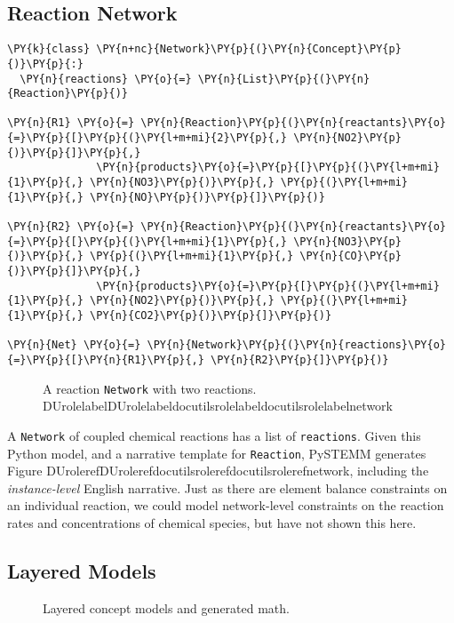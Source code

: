 \documentclass[letterpaper,compsoc,twoside]{IEEEtran}
\makeatletter
\def\PY@reset{\let\PY@it=\relax \let\PY@bf=\relax \let\PY@ul=\relax \let\PY@tc=\relax \let\PY@bc=\relax \let\PY@ff=\relax}
\def\PY@tok#1{\csname PY@tok@#1\endcsname}
\def\PY@toks#1+{\ifx\relax#1\empty\else \PY@tok{#1}\expandafter\PY@toks\fi}
\def\PY@do#1{\PY@bc{\PY@tc{\PY@ul{\PY@it{\PY@bf{\PY@ff{#1}}}}}}}
\def\PY#1#2{\PY@reset\PY@toks#1+\relax+\PY@do{#2}}
\providecommand*{\DUrole}[2]{\ifcsname DUrole#1\endcsname \csname DUrole#1\endcsname{#2}\else \ifcsname docutilsrole#1\endcsname \csname docutilsrole#1\endcsname{#2}\else #2\fi \fi }
\makeatother
\begin{document}
\subsection{Reaction Network\label{reaction-network}}
\begin{Verbatim}[commandchars=\\\{\},fontsize=\footnotesize]
\PY{k}{class} \PY{n+nc}{Network}\PY{p}{(}\PY{n}{Concept}\PY{p}{)}\PY{p}{:}
  \PY{n}{reactions} \PY{o}{=} \PY{n}{List}\PY{p}{(}\PY{n}{Reaction}\PY{p}{)}

\PY{n}{R1} \PY{o}{=} \PY{n}{Reaction}\PY{p}{(}\PY{n}{reactants}\PY{o}{=}\PY{p}{[}\PY{p}{(}\PY{l+m+mi}{2}\PY{p}{,} \PY{n}{NO2}\PY{p}{)}\PY{p}{]}\PY{p}{,}
              \PY{n}{products}\PY{o}{=}\PY{p}{[}\PY{p}{(}\PY{l+m+mi}{1}\PY{p}{,} \PY{n}{NO3}\PY{p}{)}\PY{p}{,} \PY{p}{(}\PY{l+m+mi}{1}\PY{p}{,} \PY{n}{NO}\PY{p}{)}\PY{p}{]}\PY{p}{)}

\PY{n}{R2} \PY{o}{=} \PY{n}{Reaction}\PY{p}{(}\PY{n}{reactants}\PY{o}{=}\PY{p}{[}\PY{p}{(}\PY{l+m+mi}{1}\PY{p}{,} \PY{n}{NO3}\PY{p}{)}\PY{p}{,} \PY{p}{(}\PY{l+m+mi}{1}\PY{p}{,} \PY{n}{CO}\PY{p}{)}\PY{p}{]}\PY{p}{,}
              \PY{n}{products}\PY{o}{=}\PY{p}{[}\PY{p}{(}\PY{l+m+mi}{1}\PY{p}{,} \PY{n}{NO2}\PY{p}{)}\PY{p}{,} \PY{p}{(}\PY{l+m+mi}{1}\PY{p}{,} \PY{n}{CO2}\PY{p}{)}\PY{p}{]}\PY{p}{)}

\PY{n}{Net} \PY{o}{=} \PY{n}{Network}\PY{p}{(}\PY{n}{reactions}\PY{o}{=}\PY{p}{[}\PY{n}{R1}\PY{p}{,} \PY{n}{R2}\PY{p}{]}\PY{p}{)}
\end{Verbatim}
\begin{figure}[]\noindent{}
\caption{A reaction \texttt{Network} with two reactions. \DUrole{label}{network}}
\end{figure}A \texttt{Network} of coupled chemical reactions has a list of \texttt{reactions}. Given this Python model, and a narrative template for \texttt{Reaction}, PySTEMM generates Figure \DUrole{ref}{network}, including the \emph{instance-level} English narrative. Just as there are element balance constraints on an individual reaction, we could model network-level constraints on the reaction rates and concentrations of chemical species, but have not shown this here.

\subsection{Layered Models\label{layered-models}}
\begin{figure}[]\noindent{}
\caption{Layered concept models and generated math.}
\end{figure}
\end{document}
